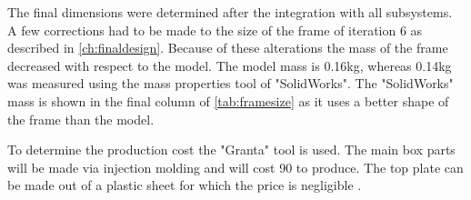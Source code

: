 The final dimensions were determined after the integration with all subsystems. A few corrections had to be made to the size of the frame of iteration 6 as described in \autoref{ch:finaldesign}. Because of these alterations the mass of the frame decreased with respect to the model. The model mass is 0.16kg, whereas 0.14kg was measured using  the mass properties tool of "SolidWorks". The "SolidWorks" mass is shown in the final column of \autoref{tab:framesize} as it uses a better shape of the frame than the model.

\begin{table}[H]
\centering
\caption{Frame size iterations}
\label{tab:framesize}
\end{table}

To determine the production cost the "Granta" tool is used\cite{materialbible}. The main box parts will be made via injection molding and will cost 90 \EUR{} to produce. The top plate can be made out of a plastic sheet for which the price is negligible \cite{sheetcost}.

